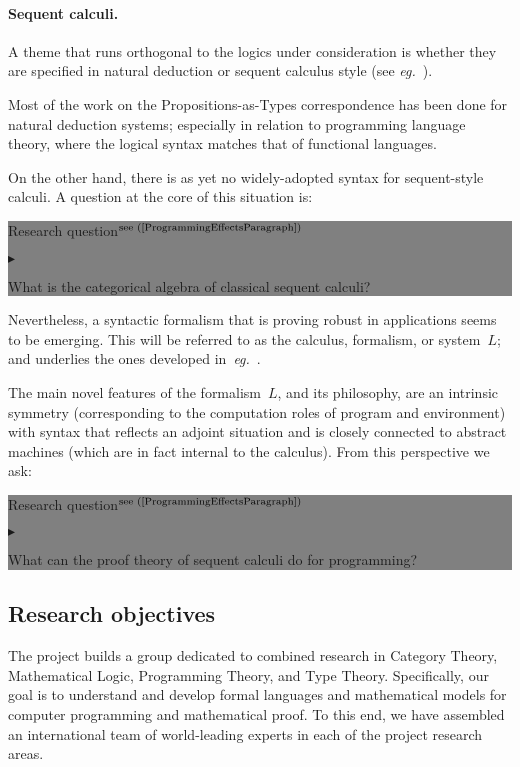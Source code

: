 \documentclass[11pt,twocolumn]{article}
\newenvironment{btritemize}
  {\begin{list}{\btr}
  {\setlength{\topsep}{2pt}
   \setlength{\partopsep}{2pt}
   \setlength{\itemsep}{2.5pt}
   \setlength{\parsep}{2.5pt}
   \setlength{\leftmargin}{1em}
   \setlength{\labelwidth}{.5em}}}
  {\end{list}}
\newcommand{\mytextsf}[1]{\textsf{\small #1}}
\newcommand{\erc}{{\small\sf MaStrPLan}}
\newcommand{\eg}{\emph{eg.}}
\newcommand{\SysL}{$L$}%
\newcommand{\btr}{$\blacktriangleright$}
\newcommand{\reqpsize}{8.113395cm}%
\newcommand{\req}[2]{\begin{center}\colorbox{grey}{\begin{minipage}{\reqpsize} 
  \mytextsf{Research question}\hfill$^{\mbox{\scriptsize see #1 }}$\\[-5.5mm]
  \begin{btritemize}
  \item #2
  \end{btritemize}
\end{minipage}}\end{center}}
\begin{document}
\paragraph{Sequent calculi.}
\label{SequentCalculiParagraph}

A theme that runs orthogonal to the logics under consideration is whether
they are specified in natural deduction or sequent calculus
style (see \eg~\cite{vonPlato}).

Most of the work on the Propositions-as-Types correspondence has been done for
natural deduction systems; especially in relation to programming language
theory, where the logical syntax matches that of functional languages.  

On the other hand, there is as yet no 
widely-adopted %
syntax for sequent-style calculi.  A question at the core of this
situation is:
%
\req{(\ref{ProgrammingEffectsParagraph})}
  {What is the categorical algebra of classical sequent calculi?}
%
Nevertheless, a syntactic formalism that is proving robust in applications
seems to be emerging.  This will be referred to as the calculus,
formalism, or system~\SysL; and underlies the ones developed
in~\eg~\cite{CurienHerbelin,Wadler,Munch,CurienMunch}.

The main novel features of the formalism~\SysL, and its philosophy, are an
intrinsic symmetry (corresponding to the computation roles of program and
environment) with syntax that reflects an adjoint situation and is closely
connected to abstract machines (which are in fact internal to the
calculus).  From this perspective we ask:
%
\req{(\ref{ProgrammingEffectsParagraph})}
  {What can the proof theory of sequent calculi do for programming?}

\subsection{Research objectives}
\label{ObjectivesSubsection}

The project %
builds a group dedicated to combined research in Category Theory,
Mathematical Logic, Programming Theory, and Type Theory.  
Specifically, our goal is to understand and develop formal languages and
mathematical models for computer programming and mathematical proof.
%
To this end, 
we have assembled %
an international team of world-leading experts in each of the project
research areas.  
\end{document}
